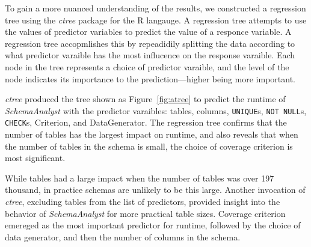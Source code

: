 
To gain a more nuanced understanding of the results, we constructed a regression tree using the \textit{ctree} package
for the R langauge. A regression tree attempts to use the values of predictor variables to predict the value of a
responce variable. A regression tree accopmlishes this by repeadidily splitting the data according to what predictor
varaible has the most influcence on the response varaible. Each node in the tree represents a choice of predictor
varaible, and the level of the node indicates its importance to the prediction---higher being more important.

\textit{ctree} produced the tree shown as Figure~\ref{fig:atree} to predict the runtime of \textit{SchemaAnalyst} with
the predictor varaibles: tables, columns, {\tt UNIQUE}s, {\tt NOT NULL}s, {\tt CHECK}s, Criterion, and DataGenerator.
The regression tree confirms that the number of tables has the largest impact on runtime, and also reveals that when the
number of tables in the schema is small, the choice of coverage criterion is most significant.

While tables had a large impact when the number of tables was over 197 thousand, in practice schemas are unlikely to be
this large. Another invocation of \textit{ctree}, excluding tables from the list of predictors, provided insight into
the behavior of \textit{SchemaAnalyst} for more practical table sizes. Coverage criterion emereged as the most important
predictor for runtime, followed by the choice of data generator, and then the number of columns in the schema.
